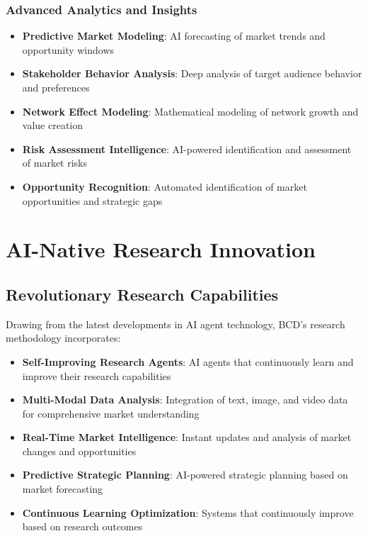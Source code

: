 \documentclass[12pt,a4paper]{book}
\begin{document}
\subsubsection{Advanced Analytics and Insights}

\begin{itemize}
    \item \textbf{Predictive Market Modeling}: AI forecasting of market trends and opportunity windows
    \item \textbf{Stakeholder Behavior Analysis}: Deep analysis of target audience behavior and preferences
    \item \textbf{Network Effect Modeling}: Mathematical modeling of network growth and value creation
    \item \textbf{Risk Assessment Intelligence}: AI-powered identification and assessment of market risks
    \item \textbf{Opportunity Recognition}: Automated identification of market opportunities and strategic gaps
\end{itemize}

\section{AI-Native Research Innovation}

\subsection{Revolutionary Research Capabilities}

Drawing from the latest developments in AI agent technology, BCD's research methodology incorporates:

\begin{itemize}
    \item \textbf{Self-Improving Research Agents}: AI agents that continuously learn and improve their research capabilities
    \item \textbf{Multi-Modal Data Analysis}: Integration of text, image, and video data for comprehensive market understanding
    \item \textbf{Real-Time Market Intelligence}: Instant updates and analysis of market changes and opportunities
    \item \textbf{Predictive Strategic Planning}: AI-powered strategic planning based on market forecasting
    \item \textbf{Continuous Learning Optimization}: Systems that continuously improve based on research outcomes
\end{itemize}
\end{document}
